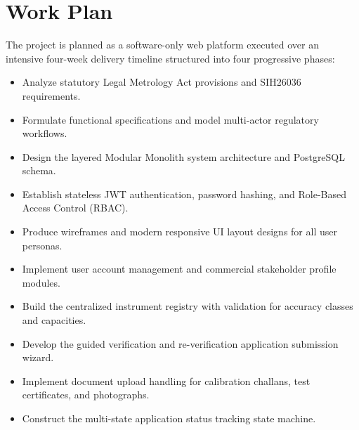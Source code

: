 \documentclass[11pt,a4paper]{article}
\begin{document}
\section{Work Plan}
The project is planned as a software-only web platform executed over an intensive four-week delivery timeline structured into four progressive phases:

\begin{tcolorbox}[enhanced, colback=white, colframe=primarynavy!40, boxrule=0.8pt, arc=2mm, title={\color{primarynavy}\textbf{Phase I: Requirement Analysis \& System Design (Week 1)}}]
    \begin{itemize}
        \item Analyze statutory Legal Metrology Act provisions and SIH26036 requirements.
        \item Formulate functional specifications and model multi-actor regulatory workflows.
        \item Design the layered Modular Monolith system architecture and PostgreSQL schema.
        \item Establish stateless JWT authentication, password hashing, and Role-Based Access Control (RBAC).
        \item Produce wireframes and modern responsive UI layout designs for all user personas.
    \end{itemize}
\end{tcolorbox}

\begin{tcolorbox}[enhanced, colback=white, colframe=primarynavy!40, boxrule=0.8pt, arc=2mm, title={\color{primarynavy}\textbf{Phase II: Core System Development (Week 2)}}]
    \begin{itemize}
        \item Implement user account management and commercial stakeholder profile modules.
        \item Build the centralized instrument registry with validation for accuracy classes and capacities.
        \item Develop the guided verification and re-verification application submission wizard.
        \item Implement document upload handling for calibration challans, test certificates, and photographs.
        \item Construct the multi-state application status tracking state machine.
    \end{itemize}
\end{tcolorbox}
\end{document}
